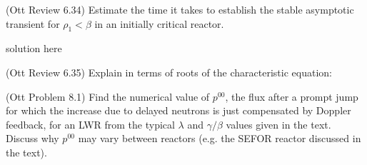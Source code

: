 \documentclass[11pt,addpoints,answers]{exam}
\begin{document}
\begin{questions}

        \question (Ott Review 6.34) Estimate the time it takes to establish the 
        stable asymptotic transient for $\rho_1 < \beta$ in an initially 
        critical reactor.
                \begin{solution}
                        solution here
                \end{solution}


        \question[10] (Ott Review 6.35) Explain in terms of roots of the 
        characteristic equation:

        
        \question[30] (Ott Problem 8.1) Find the numerical value of $p^{00}$, 
        the flux after a prompt jump for which the increase due to delayed 
        neutrons is just compensated by Doppler feedback, for an LWR from the 
        typical $\lambda$ and $\gamma/\beta$ values given in the text. Discuss 
        why $p^{00}$ may vary between reactors (e.g. the SEFOR reactor 
        discussed in the text).


\end{questions}
\end{document}
